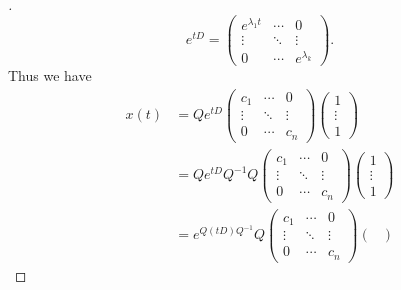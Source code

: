 \begin{proof}[]
  \[
    e^{tD} = \begin{pmatrix}
      e^{\lambda_1 t} & \cdots & 0             \\
      \vdots          & \ddots & \vdots        \\
      0               & \cdots & e^{\lambda_k}
    \end{pmatrix}.
  \]
  Thus we have
  \begin{align*}
    x(t) & = Q e^{tD} \begin{pmatrix}
                        c_1    & \cdots & 0      \\
                        \vdots & \ddots & \vdots \\
                        0      & \cdots & c_n
                      \end{pmatrix} \begin{pmatrix}
                                      1      \\
                                      \vdots \\
                                      1
                                    \end{pmatrix}                               \\
         & = Q e^{tD} Q^{-1} Q \begin{pmatrix}
                                 c_1    & \cdots & 0      \\
                                 \vdots & \ddots & \vdots \\
                                 0      & \cdots & c_n
                               \end{pmatrix} \begin{pmatrix}
                                               1      \\
                                               \vdots \\
                                               1
                                             \end{pmatrix}                      \\
         & = e^{Q (tD) Q^{-1}} Q \begin{pmatrix}
                                   c_1    & \cdots & 0      \\
                                   \vdots & \ddots & \vdots \\
                                   0      & \cdots & c_n
                                 \end{pmatrix} \begin{pmatrix}

\end{pmatrix}
\end{align*}
\end{proof}
